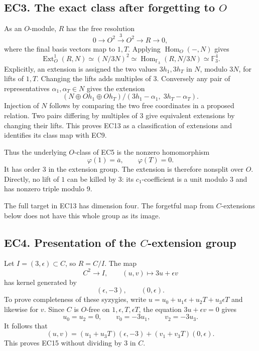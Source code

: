 \documentclass[
  10pt,
  a4paper,
]{article}
\begin{document}
\subsection{\texorpdfstring{EC3. The exact class after forgetting to
\(O\)}{EC3. The exact class after forgetting to O}}\label{ec3.-the-exact-class-after-forgetting-to-o}

As an \(O\)-module, \(R\) has the free resolution \[
0\longrightarrow O^2\xrightarrow{3}O^2\longrightarrow R
\longrightarrow0,
\] where the final basis vectors map to \(1,T\). Applying
\(\operatorname{Hom}_O(-,N)\) gives \[
\operatorname{Ext}^1_O(R,N)
\simeq(N/3N)^2
\simeq\operatorname{Hom}_{\mathbb F_3}(R,N/3N)
\simeq\mathbb F_3^4.
\tag{EC13}
\] Explicitly, an extension is assigned the two values \(3h_1,3h_T\) in
\(N\), modulo \(3N\), for lifts of \(1,T\). Changing the lifts adds
multiples of 3. Conversely any pair of representatives
\(\alpha_1,\alpha_T\in N\) gives the extension \[
(N\oplus O h_1\oplus O h_T)/
(3h_1-\alpha_1,\;3h_T-\alpha_T).
\] Injection of \(N\) follows by comparing the two free coordinates in a
proposed relation. Two pairs differing by multiples of 3 give equivalent
extensions by changing their lifts. This proves EC13 as a classification
of extensions and identifies its class map with EC9.

Thus the underlying \(O\)-class of EC5 is the nonzero homomorphism \[
\varphi(1)=\overline a,\qquad\varphi(T)=0.
\tag{EC14}
\] It has order 3 in the extension group. The extension is therefore
nonsplit over \(O\). Directly, no lift of \(1\) can be killed by 3: its
\(c_1\)-coefficient is a unit modulo 3 and has nonzero triple modulo 9.

The full target in EC13 has dimension four. The forgetful map from
\(C\)-extensions below does not have this whole group as its image.

\subsection{\texorpdfstring{EC4. Presentation of the \(C\)-extension
group}{EC4. Presentation of the C-extension group}}\label{ec4.-presentation-of-the-c-extension-group}

Let \(I=(3,\epsilon)\subset C\), so \(R=C/I\). The map \[
C^2\longrightarrow I,\qquad (u,v)\longmapsto3u+\epsilon v
\] has kernel generated by \[
(\epsilon,-3),\qquad(0,\epsilon).
\tag{EC15}
\] To prove completeness of these syzygies, write
\(u=u_0+u_1\epsilon+u_2T+u_3\epsilon T\) and likewise for \(v\). Since
\(C\) is \(O\)-free on \(1,\epsilon,T,\epsilon T\), the equation
\(3u+\epsilon v=0\) gives \[
u_0=u_2=0,\qquad v_0=-3u_1,\qquad v_2=-3u_3.
\] It follows that \[
(u,v)=(u_1+u_3T)(\epsilon,-3)+(v_1+v_3T)(0,\epsilon).
\] This proves EC15 without dividing by 3 in \(C\).
\end{document}
